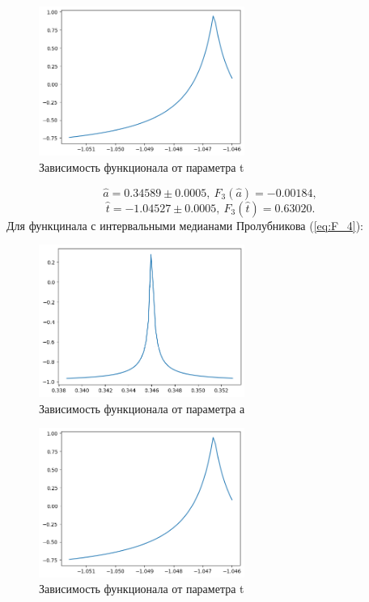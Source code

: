 \documentclass{article}
\begin{document}
  \begin{figure}[htbp!]
  \begin{center}
      \includegraphics[width = 0.6\textwidth]{t_med_k}
      \caption{Зависимость функционала от параметра t}
  \label{figure:t_med_k}
  \end{center}
  \end{figure}

  \[ \hat a = 0.34589 \pm 0.0005, \ F_3 (\hat a) = -0.00184, \]
  \[ \hat t = -1.04527 \pm 0.0005, \ F_3 (\hat t) = 0.63020. \]
  \newpage
  Для функцинала с интервальными медианами Пролубникова (\ref{eq:F_4}):

  \begin{figure}[htbp!]
    \begin{center}
        \includegraphics[width = 0.6\textwidth]{a_med_p}
        \caption{Зависимость функционала от параметра а}
  \label{figure:a_med_p}
    \end{center}
  \end{figure}

  \begin{figure}[htbp!]
  \begin{center}
      \includegraphics[width = 0.6\textwidth]{t_med_p}
      \caption{Зависимость функционала от параметра t}
  \label{figure:t_med_p}
  \end{center}
  \end{figure}
\end{document}
